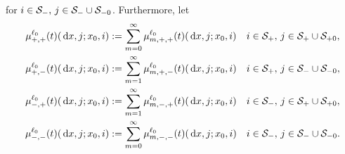 for \(i\in\mathcal{S}_-,\,j\in\mathcal{S}_-\cup\mathcal{S}_{-0}\).
Furthermore, let 
\begin{align}
		\mu^{\ell_0}_{+,+}(t)(\, \mathrm{d} x,j;x_0,i)  &:= \sum_{m=0}^\infty \mu^{\ell_0}_{m,+,+}(t)(\, \mathrm{d} x,j;x_0,i)  && i\in\mathcal{S}_+,\,j\in\mathcal S_+\cup\mathcal{S}_{+0}, \label{eqn: ljg97skg}
		\\ \mu^{\ell_0}_{+,-}(t)(\, \mathrm{d} x,j;x_0,i)  &:= \sum_{m=1}^\infty \mu^{\ell_0}_{m,+,-}(t)(\, \mathrm{d} x,j;x_0,i)  && i\in\mathcal S_+,\,j\in\mathcal S_-\cup\mathcal{S}_{-0},
		\\ \mu^{\ell_0}_{-,+}(t)(\, \mathrm{d} x,j;x_0,i) &:= \sum_{m=1}^\infty \mu^{\ell_0}_{m,-,+}(t)(\, \mathrm{d} x,j;x_0,i)  && i\in\mathcal S_-,\,j\in\mathcal S_+\cup\mathcal{S}_{+0},
		\\ \mu^{\ell_0}_{-,-}(t)(\, \mathrm{d} x,j;x_0,i)  &:= \sum_{m=0}^\infty \mu^{\ell_0}_{m,-,-}(t)(\, \mathrm{d} x,j;x_0,i)  && i\in\mathcal{S}_-,\,j\in\mathcal S_-\cup\mathcal{S}_{-0}. \label{eqn: ljg97skg2}
\end{align}

